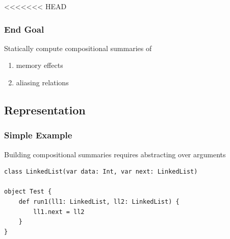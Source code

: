 \documentclass[hyperref={pdfpagelabels=false}]{beamer}
\begin{document}
\begin{frame}[label=overview]
\begin{frame}
<<<<<<< HEAD
\frametitle{End Goal}
    Statically compute compositional summaries of
    \begin{enumerate}
        \item memory effects
        \item aliasing relations
    \end{enumerate}
\end{frame}

\subsection{Representation}

\begin{frame}[fragile]
\frametitle{Simple Example}

    Building compositional summaries requires abstracting over arguments

\begin{lstlisting}
class LinkedList(var data: Int, var next: LinkedList)

object Test {
    def run1(ll1: LinkedList, ll2: LinkedList) {
        ll1.next = ll2
    }
}
\end{lstlisting}
\end{frame}


\end{frame}
\end{document}
